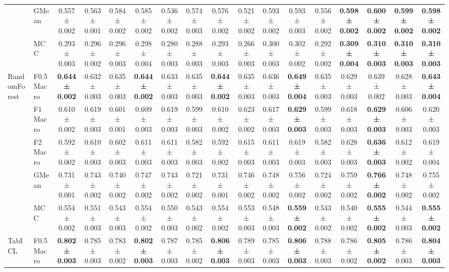 \begin{table}[H]
{\begin{tabular}{llccccccccccccccc}
 & GMean & 0.557 ± 0.002 & 0.563 ± 0.001 & 0.584 ± 0.002 & 0.585 ± 0.002 & 0.536 ± 0.002 & 0.574 ± 0.003 & 0.576 ± 0.002 & 0.521 ± 0.002 & 0.593 ± 0.002 & 0.593 ± 0.003 & 0.556 ± 0.002 & \textbf{0.598 ± 0.002} & \textbf{0.600 ± 0.002} & \textbf{0.599 ± 0.002} & \textbf{0.598 ± 0.002} \\
 & MCC & 0.293 ± 0.003 & 0.296 ± 0.002 & 0.296 ± 0.003 & 0.298 ± 0.004 & 0.280 ± 0.003 & 0.288 ± 0.003 & 0.293 ± 0.003 & 0.266 ± 0.003 & 0.300 ± 0.003 & 0.302 ± 0.002 & 0.292 ± 0.002 & \textbf{0.309 ± 0.004} & \textbf{0.310 ± 0.003} & \textbf{0.310 ± 0.003} & \textbf{0.310 ± 0.003} \\
\cline{1-17}
\multirow[t]{5}{*}{RandomForest} & F0.5 Macro & \textbf{0.644 ± 0.002} & 0.632 ± 0.003 & 0.635 ± 0.003 & \textbf{0.644 ± 0.002} & 0.633 ± 0.003 & 0.635 ± 0.003 & \textbf{0.644 ± 0.002} & 0.635 ± 0.003 & 0.636 ± 0.003 & \textbf{0.649 ± 0.004} & 0.635 ± 0.003 & 0.629 ± 0.003 & 0.639 ± 0.002 & 0.628 ± 0.003 & \textbf{0.643 ± 0.004} \\
 & F1 Macro & 0.610 ± 0.002 & 0.619 ± 0.003 & 0.601 ± 0.001 & 0.609 ± 0.003 & 0.619 ± 0.003 & 0.599 ± 0.003 & 0.610 ± 0.002 & 0.623 ± 0.002 & 0.617 ± 0.003 & \textbf{0.629 ± 0.003} & 0.599 ± 0.003 & 0.618 ± 0.003 & \textbf{0.629 ± 0.003} & 0.606 ± 0.003 & 0.620 ± 0.003 \\
 & F2 Macro & 0.592 ± 0.002 & 0.610 ± 0.003 & 0.602 ± 0.003 & 0.611 ± 0.003 & 0.611 ± 0.003 & 0.582 ± 0.003 & 0.592 ± 0.002 & 0.615 ± 0.003 & 0.611 ± 0.003 & 0.619 ± 0.003 & 0.582 ± 0.003 & 0.628 ± 0.003 & \textbf{0.636 ± 0.003} & 0.612 ± 0.002 & 0.619 ± 0.004 \\
 & GMean & 0.731 ± 0.001 & 0.743 ± 0.002 & 0.740 ± 0.002 & 0.747 ± 0.002 & 0.743 ± 0.002 & 0.721 ± 0.002 & 0.731 ± 0.001 & 0.746 ± 0.002 & 0.748 ± 0.002 & 0.756 ± 0.002 & 0.724 ± 0.002 & 0.759 ± 0.002 & \textbf{0.766 ± 0.002} & 0.748 ± 0.002 & 0.755 ± 0.002 \\
 & MCC & 0.554 ± 0.002 & 0.551 ± 0.003 & 0.543 ± 0.003 & 0.554 ± 0.002 & 0.550 ± 0.003 & 0.543 ± 0.002 & 0.554 ± 0.002 & 0.553 ± 0.003 & 0.548 ± 0.003 & \textbf{0.559 ± 0.002} & 0.543 ± 0.002 & 0.540 ± 0.002 & \textbf{0.555 ± 0.002} & 0.544 ± 0.003 & \textbf{0.555 ± 0.002} \\
\cline{1-17}
\multirow[t]{5}{*}{TabICL} & F0.5 Macro & \textbf{0.802 ± 0.003} & 0.785 ± 0.003 & 0.783 ± 0.002 & \textbf{0.802 ± 0.003} & 0.787 ± 0.003 & 0.785 ± 0.002 & \textbf{0.806 ± 0.003} & 0.789 ± 0.003 & 0.785 ± 0.003 & \textbf{0.806 ± 0.003} & 0.788 ± 0.003 & 0.786 ± 0.002 & \textbf{0.805 ± 0.002} & 0.786 ± 0.003 & \textbf{0.804 ± 0.003} \\

\end{tabular}}
\end{table}
